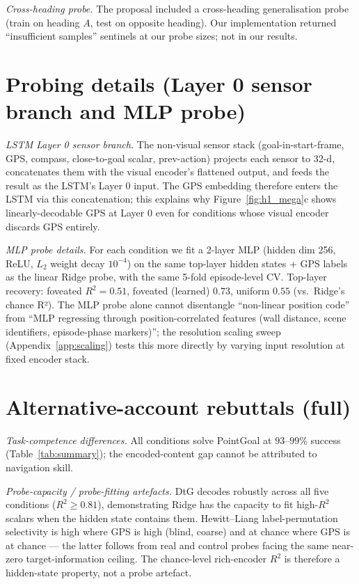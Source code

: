 \documentclass{article}
\begin{document}
\emph{Cross-heading probe.} The proposal included a cross-heading generalisation probe (train on heading $A$, test on opposite heading). Our implementation returned ``insufficient samples'' sentinels at our probe sizes; not in our results.

\section{Probing details (Layer 0 sensor branch and MLP probe)}
\label{app:probe-details}

\emph{LSTM Layer 0 sensor branch.} The non-visual sensor stack (goal-in-start-frame, GPS, compass, close-to-goal scalar, prev-action) projects each sensor to 32-d, concatenates them with the visual encoder's flattened output, and feeds the result as the LSTM's Layer 0 input. The GPS embedding therefore enters the LSTM via this concatenation; this explains why Figure~\ref{fig:h1_mega}c shows linearly-decodable GPS at Layer 0 even for conditions whose visual encoder discards GPS entirely.

\emph{MLP probe details.} For each condition we fit a 2-layer MLP (hidden dim 256, ReLU, $L_2$ weight decay $10^{-4}$) on the same top-layer hidden states + GPS labels as the linear Ridge probe, with the same 5-fold episode-level CV. Top-layer recovery: foveated $R^2 = 0.51$, foveated (learned) $0.73$, uniform $0.55$ (vs.\ Ridge's chance R²). The MLP probe alone cannot disentangle ``non-linear position code'' from ``MLP regressing through position-correlated features (wall distance, scene identifiers, episode-phase markers)''; the resolution scaling sweep (Appendix~\ref{app:scaling}) tests this more directly by varying input resolution at fixed encoder stack.

\section{Alternative-account rebuttals (full)}
\label{app:alt-accounts}

\emph{Task-competence differences.} All conditions solve PointGoal at $93$--$99\%$ success (Table~\ref{tab:summary}); the encoded-content gap cannot be attributed to navigation skill.

\emph{Probe-capacity / probe-fitting artefacts.} DtG decodes robustly across all five conditions ($R^2 \geq 0.81$), demonstrating Ridge has the capacity to fit high-$R^2$ scalars when the hidden state contains them. Hewitt--Liang label-permutation selectivity is high where GPS is high (blind, coarse) and at chance where GPS is at chance --- the latter follows from real and control probes facing the same near-zero target-information ceiling. The chance-level rich-encoder $R^2$ is therefore a hidden-state property, not a probe artefact.
\end{document}
